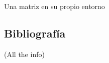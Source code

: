 \documentclass[12pt, a4paper, titlepage]{article}
\begin{document}
  Una matriz en su propio entorno

  \begin{figure}[H]
    \hspace{2.5em} 
  \end{figure}


  \newpage
  \begin{appendices}
    \makeatletter

    \section{Bibliografía}

    (All the info)

  \end{appendices}
\end{document}
